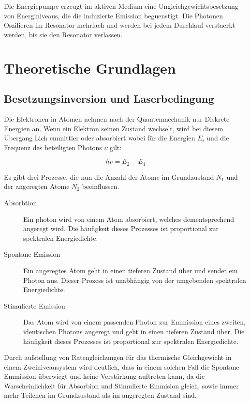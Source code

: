 \documentclass[slug=GL, room=HZDR\ Dresden/Rossendorf\,\ Geb.\ 620/123, supervisor=Martin\ Rehwald;\, Tim\ Ziegler]{../../Lab_Report_LaTeX/lab_report}
\begin{document}
Die Energiepumpe erzeugt im aktiven Medium eine
Ungleichgewichtsbesetzung von Energiniveaus, die die induzierte
Emission beguenstigt. Die Photonen Oszilieren im Resonator mehrfach
und werden bei jedem Durchlauf verstaerkt werden, bis sie den
Resonator verlassen.

\section{Theoretische Grundlagen}%
\label{sec:theo}

\subsection{Besetzungsinversion und Laserbedingung}%
\label{sec:inv}

Die Elektronen in Atomen nehmen nach der Quantenmechanik nur Diskrete
Energien an. Wenn ein Elektron seinen Zustand wechselt, wird bei
diesem \"Ubergang Lich emmittier oder absorbiert wobei f\"ur die
Energien \(E_i\) und die Frequenz des beteiligten Photons \(\nu\) gilt:

\begin{equation}
  \label{eq:transfreq}
  h\nu = E_2 - E_1
\end{equation}

Es gibt drei Prozesse, die nun die Anzahl der Atome im Grundzustand
\(N_1\) und der angeregten Atome \(N_2\) beeinflussen.

\begin{description}
\item[Absorbtion] Ein photon wird von einem Atom absorbiert, welches
  dementsprechend angeregt wird. Die h\"aufigkeit dieses Prozesses ist
  proportional zur spektralen Energiedichte.
\item[Spontane Emission] Ein angeregtes Atom geht in einen tieferen
  Zustand \"uber und sendet ein Photon aus. Dieser Prozess ist
  unabh\"angig von der umgebenden spektralen Energiedichte.
\item[Stimulierte Emission] Das Atom wird von einem passenden Photon
  zur Emmission eines zweiten, identischen Photons angeregt und geht
  in einen tieferen Zustand \"uber. Die h\"aufigkeit dieses Prozesses ist
  proportional zur spektralen Energiedichte.
\end{description}

Durch aufstellung von Ratengleichungen f\"ur das thermische
Gleichgewicht in einem Zweiniveausystem wird deutlich, dass in einem
solchen Fall die Spontane Emmission \"uberwiegt und keine
Verst\"arkung auftreten kann, da die Warscheinlichkeit f\"ur Absorbion
und Stimulierte Emmision gleich, sowie immer mehr Teilchen im
Grundzustand als im angeregten Zustand sind.
\end{document}
